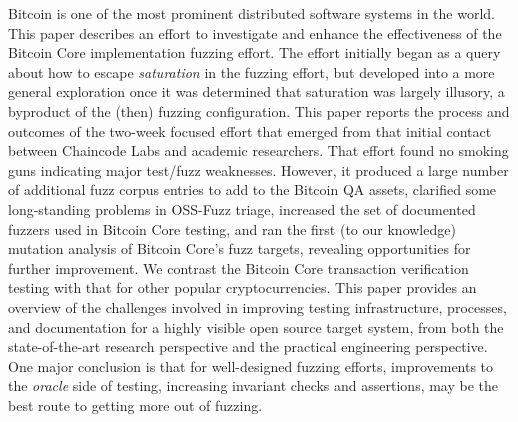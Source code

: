 Bitcoin is one of the most prominent distributed software systems in the world.  This paper describes an effort to investigate and enhance the effectiveness of the Bitcoin Core implementation fuzzing effort.  The effort initially began as a query about how to escape \emph{saturation} in the fuzzing effort, but developed into a more general exploration once it was determined that saturation was largely illusory, a byproduct of the (then) fuzzing configuration.  This paper reports the process and outcomes of the two-week focused effort that emerged from that initial contact between Chaincode Labs and academic researchers.  That effort found no smoking guns indicating major test/fuzz weaknesses. However, it produced a large number of additional fuzz corpus entries to add to the Bitcoin QA assets, clarified some long-standing problems in OSS-Fuzz triage, increased the set of documented fuzzers used in Bitcoin Core testing, and ran the first (to our knowledge) mutation analysis of Bitcoin Core's fuzz targets, revealing opportunities for further improvement.  We contrast the Bitcoin Core transaction verification testing with that for other popular cryptocurrencies.  This paper provides an overview of the challenges involved in improving testing infrastructure, processes, and documentation for a highly visible open source target system, from both the state-of-the-art research perspective and the practical engineering perspective.  One major conclusion is that for well-designed fuzzing efforts, improvements to the \emph{oracle} side of testing, increasing invariant checks and assertions, may be the best route to getting more out of fuzzing.

